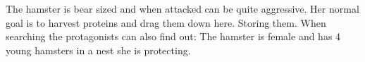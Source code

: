 \begin{npcBox}[title=Hamster]
    \begin{consequences}
    \item {}
    \item {}
    \item {}
    \end{consequences}
    
    \begin{npcDescription}
    The hamster is bear sized and when attacked can be quite aggressive. Her normal goal is to harvest proteins and drag them down here. Storing them. When searching the protagonists can also find out: The hamster is female and has 4 young hamsters in a nest she is protecting.
    \end{npcDescription}
    
\end{npcBox}


